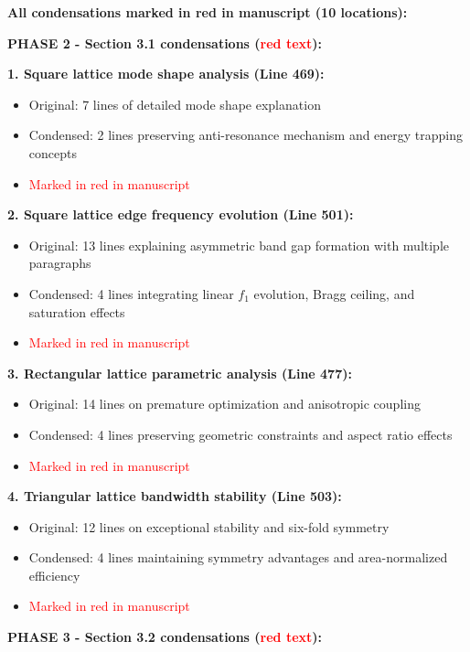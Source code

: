 \documentclass[11pt,a4paper]{article}
\newenvironment{changesbox}{%
    \par\medskip\noindent{\color{changescolor}\rule{\linewidth}{2pt}}\par
    \noindent{\color{changescolor}\bfseries Manuscript Changes}\par\smallskip
}{%
    \par\noindent{\color{changescolor}\rule{\linewidth}{0.5pt}}\medskip
}
\begin{document}
\begin{changesbox}
\textbf{All condensations marked in red in manuscript (10 locations):}

\textbf{PHASE 2 - Section 3.1 condensations (\textcolor{red}{red text}):}

\textbf{1. Square lattice mode shape analysis (Line 469):}
\begin{itemize}
    \item Original: 7 lines of detailed mode shape explanation
    \item Condensed: 2 lines preserving anti-resonance mechanism and energy trapping concepts
    \item \textcolor{red}{Marked in red in manuscript}
\end{itemize}

\textbf{2. Square lattice edge frequency evolution (Line 501):}
\begin{itemize}
    \item Original: 13 lines explaining asymmetric band gap formation with multiple paragraphs
    \item Condensed: 4 lines integrating linear $f_1$ evolution, Bragg ceiling, and saturation effects
    \item \textcolor{red}{Marked in red in manuscript}
\end{itemize}

\textbf{3. Rectangular lattice parametric analysis (Line 477):}
\begin{itemize}
    \item Original: 14 lines on premature optimization and anisotropic coupling
    \item Condensed: 4 lines preserving geometric constraints and aspect ratio effects
    \item \textcolor{red}{Marked in red in manuscript}
\end{itemize}

\textbf{4. Triangular lattice bandwidth stability (Line 503):}
\begin{itemize}
    \item Original: 12 lines on exceptional stability and six-fold symmetry
    \item Condensed: 4 lines maintaining symmetry advantages and area-normalized efficiency
    \item \textcolor{red}{Marked in red in manuscript}
\end{itemize}

\textbf{PHASE 3 - Section 3.2 condensations (\textcolor{red}{red text}):}


\end{changesbox}
\end{document}
